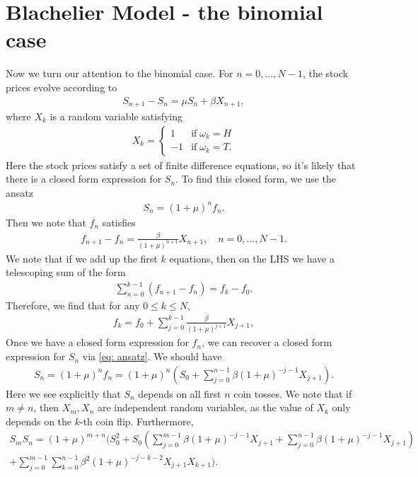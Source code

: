 \section{Blachelier Model - the binomial case}
Now we turn our attention to the binomial case. For $n = 0, \ldots , N-1$, the stock prices evolve according to 
\begin{align}
	 S_{n+1} - S_n = \mu S_n + \beta X_{n+1},
\end{align}
where $X_k$ is a random variable satisfying 
\begin{align}
	 X_k = \begin{cases}
		 1 & \text{if} \; \omega_k = H \\
		 -1 & \text{if} \; \omega_k = T.
	 \end{cases}
\end{align}
Here the stock prices satisfy a set of finite difference equations, so it's likely that there is a closed form expression for $S_n$. To find this closed form, we use the ansatz 
\begin{align}\label{eq: ansatz}
	 S_n = (1+\mu)^n f_n.
\end{align}
Then we note that $f_n$ satisfies 
\begin{align}
	 f_{n+1} - f_n = \frac{\beta}{(1+\mu)^{n+1}} X_{n+1}, \quad n = 0, \ldots , N-1.
\end{align}
We note that if we add up the first $k$ equations, then on the LHS we have a telescoping sum of the form 
\begin{align}
	 \sum_{n=0}^{k-1} (f_{n+1} - f_n) = f_k - f_0.
\end{align}
Therefore, we find that for any $0 \le k \le N$, 
\begin{align}
	 f_k = f_0 + \sum_{j=0}^{k-1} \frac{\beta}{(1+\mu)^{j+1}} X_{j+1}, 
\end{align}
Once we have a closed form expression for $f_n$, we can recover a closed form expression for $S_n$ via \eqref{eq: ansatz}. We should have 
\begin{align}
	 S_n =(1+\mu)^n f_n = (1+\mu)^n\left( S_0  + \sum_{j=0}^{n-1} \beta (1+\mu)^{-j-1} X_{j+1} \right).
\end{align}
Here we see explicitly that $S_n$ depends on all first $n$ coin tosses. We note that if $m \neq n$, then $X_m, X_n$ are independent random variables, as the value of $X_k$ only depends on the $k$-th coin flip. Furthermore, 
\begin{multline}
	 S_m S_n = (1+\mu)^{m+n} \bigg( S_0^2 +  S_0 \left( \sum_{j=0}^{m-1} \beta (1+\mu)^{-j-1} X_{j+1}  + \sum_{j=0}^{n-1} \beta (1+\mu)^{-j-1} X_{j+1}  \right) \\ +   \sum_{j=0}^{m-1}  \sum_{k=0}^{n-1} \beta^2 (1+\mu)^{-j-k-2} X_{j+1} X_{k+1}\bigg).
\end{multline}
